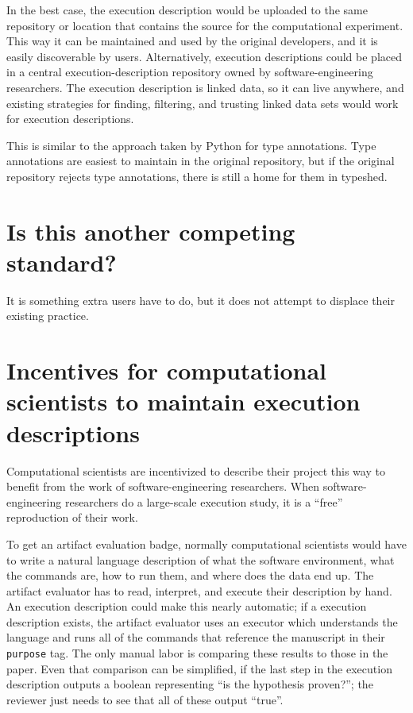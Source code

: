 \documentclass[manuscript,authordraft]{acmart}
\begin{document}
In the best case, the execution description would be uploaded to the
same repository or location that contains the source for the
computational experiment. This way it can be maintained and used by the
original developers, and it is easily discoverable by users.
Alternatively, execution descriptions could be placed in a central
execution-description repository owned by software-engineering
researchers. The execution description is linked data, so it can live
anywhere, and existing strategies for finding, filtering, and trusting
linked data sets would work for execution descriptions.

This is similar to the approach taken by Python for type annotations.
Type annotations are easiest to maintain in the original repository, but
if the original repository rejects type annotations, there is still a
home for them in typeshed.

\hypertarget{is-this-another-competing-standard}{%
\section{Is this another competing
standard?}\label{is-this-another-competing-standard}}

It is something extra users have to do, but it does not attempt to
displace their existing practice.

\hypertarget{incentives-for-computational-scientists-to-maintain-execution-descriptions}{%
\section{Incentives for computational scientists to maintain execution
descriptions}\label{incentives-for-computational-scientists-to-maintain-execution-descriptions}}

Computational scientists are incentivized to describe their project this
way to benefit from the work of software-engineering researchers. When
software-engineering researchers do a large-scale execution study, it is
a ``free'' reproduction of their work.

To get an artifact evaluation badge, normally computational scientists
would have to write a natural language description of what the software
environment, what the commands are, how to run them, and where does the
data end up. The artifact evaluator has to read, interpret, and execute
their description by hand. An execution description could make this
nearly automatic; if a execution description exists, the artifact
evaluator uses an executor which understands the language and runs all
of the commands that reference the manuscript in their \texttt{purpose}
tag. The only manual labor is comparing these results to those in the
paper. Even that comparison can be simplified, if the last step in the
execution description outputs a boolean representing ``is the hypothesis
proven?''; the reviewer just needs to see that all of these output
``true''.



%


\end{document}

